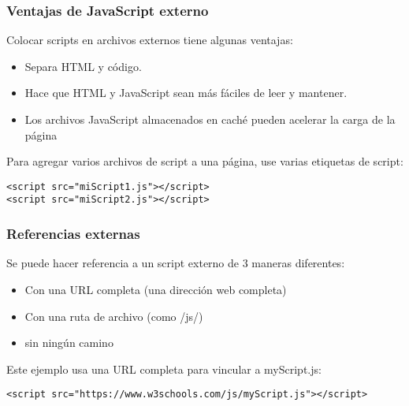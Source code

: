\begin{frame}[fragile]
  \frametitle{Ventajas de JavaScript externo}

  Colocar scripts en archivos externos tiene algunas ventajas:

  \vspace{\baselineskip}
  \begin{itemize}
    \item Separa HTML y código.
    \item Hace que HTML y JavaScript sean más fáciles de leer y mantener.
    \item Los archivos JavaScript almacenados en caché pueden
      acelerar la carga de la página
  \end{itemize}

  \vspace{\baselineskip}
  Para agregar varios archivos de script a una página,
  use varias etiquetas de script:

  \vspace{\baselineskip}
  \begin{lstlisting}
<script src="miScript1.js"></script>
<script src="miScript2.js"></script>
  \end{lstlisting}
\end{frame}

\begin{frame}[fragile]
  \frametitle{Referencias externas}

  Se puede hacer referencia a un script externo de 3 maneras diferentes:

  \vspace{\baselineskip}
  \begin{itemize}
    \item Con una URL completa (una dirección web completa)
    \item Con una ruta de archivo (como /js/)
    \item sin ningún camino
  \end{itemize}

  \vspace{\baselineskip}
  Este ejemplo usa una URL completa para vincular a myScript.js:

  \vspace{\baselineskip}
  \begin{lstlisting}
<script src="https://www.w3schools.com/js/myScript.js"></script>
  \end{lstlisting}
\end{frame}

